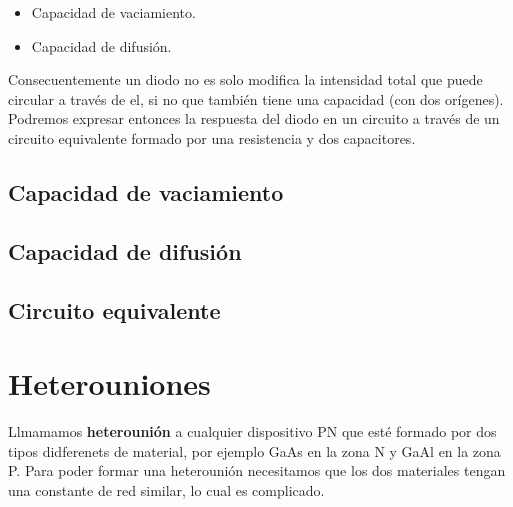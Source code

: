 \begin{itemize}
    \item Capacidad de vaciamiento.
    \item Capacidad de difusión.
\end{itemize}
Consecuentemente un diodo no es solo modifica la intensidad total que puede circular a través de el, si no que también tiene una capacidad (con dos orígenes). Podremos expresar entonces la respuesta del diodo en un circuito a través de un circuito equivalente formado por una resistencia y dos capacitores. 
\subsection{Capacidad de vaciamiento}

\subsection{Capacidad de difusión}

\subsection{Circuito equivalente}




\section{Heterouniones}

Llmamamos \textbf{heterounión} a cualquier dispositivo PN que esté formado por dos tipos didferenets de material, por ejemplo GaAs en la zona N y GaAl en la zona P. Para poder formar una heterounión necesitamos que los dos materiales tengan una constante de red similar, lo cual es complicado. 






